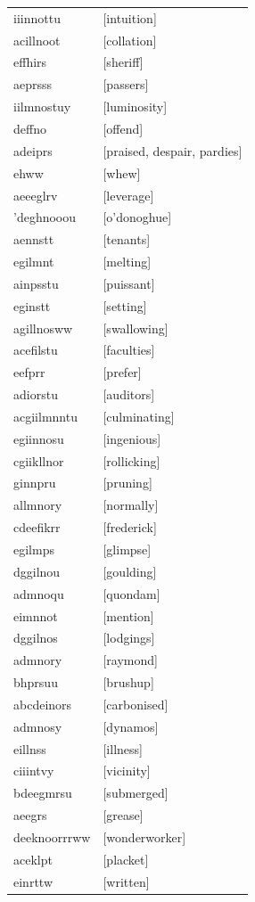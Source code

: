 \documentclass{article}
\begin{document}
\begin{tabular}{ll}
iiinnottu & [intuition] \\
acillnoot & [collation] \\
effhirs & [sheriff] \\
aeprsss & [passers] \\
iilmnostuy & [luminosity] \\
deffno & [offend] \\
adeiprs & [praised, despair, pardies] \\
ehww & [whew] \\
aeeeglrv & [leverage] \\
'deghnooou & [o'donoghue] \\
aennstt & [tenants] \\
egilmnt & [melting] \\
ainpsstu & [puissant] \\
eginstt & [setting] \\
agillnosww & [swallowing] \\
acefilstu & [faculties] \\
eefprr & [prefer] \\
adiorstu & [auditors] \\
acgiilmnntu & [culminating] \\
egiinnosu & [ingenious] \\
cgiikllnor & [rollicking] \\
ginnpru & [pruning] \\
allmnory & [normally] \\
cdeefikrr & [frederick] \\
egilmps & [glimpse] \\
dggilnou & [goulding] \\
admnoqu & [quondam] \\
eimnnot & [mention] \\
dggilnos & [lodgings] \\
admnory & [raymond] \\
bhprsuu & [brushup] \\
abcdeinors & [carbonised] \\
admnosy & [dynamos] \\
eillnss & [illness] \\
ciiintvy & [vicinity] \\
bdeegmrsu & [submerged] \\
aeegrs & [grease] \\
deeknoorrrww & [wonderworker] \\
aceklpt & [placket] \\
einrttw & [written] \\

\end{tabular}
\end{document}

